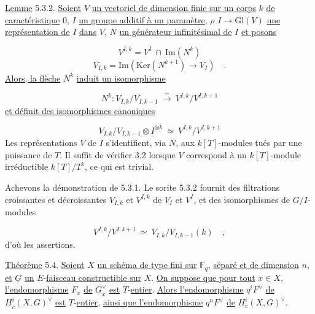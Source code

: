 \underline{Lemme} 5.3.2. \underline{Soient} $V$ \underline{un vectoriel de dimension finie sur un corps} $k$ \underline{de caractéristique} $0$, $I$ \underline{un groupe additif à un paramètre}, $\rho$ $I \longrightarrow \mathrm{Gl}(V)$ \underline{une représentation de} $I$ \underline{dans} $V$, $N$ \underline{un générateur infinitésimal de} $I$ \underline{et posons}

\begin{equation*}
V^{I,k} = V^I \ \cap \ \mathrm{Im}(N^k)
\end{equation*}
\begin{equation*}
V_{I,k} = \mathrm{Im}(\mathrm{Ker}(N^{k+1}) \longrightarrow V_I) \quad .
\end{equation*}
\underline{Alors, la flèche} $N^k$ \underline{induit un isomorphisme}

\begin{equation*}
N^k : V_{I,k}/V_{I,k-1} \ \overset{\sim}{\longrightarrow} \ V^{I,k}/V^{I,k+1}
\end{equation*}
\underline{et définit des isomorphismes canoniques}

\begin{equation*}
V_{I,k}/V_{I,k-1} \otimes I^{\otimes k} \ \simeq \ V^{I,k}/V^{I,k+1}
\end{equation*}
Les représentations $V$ de $I$ s'identifient, via $N$, aux $k[T]$-modules tués par une puissance de $T$. Il suffit de vérifier 3.2 lorsque $V$ correspond à un $k[T]$-module irréductible $k[T]/T^k$, ce qui est trivial.

Achevons la démonstration de 5.3.1. Le sorite 5.3.2 fournit des filtrations croissantes et décroissantes $V_{I,k}$ et $V^{I,k}$ de $V_I$ et $V^I$, et des isomorphismes de $G/I$-modules

\begin{equation*}
V^{I,k}/V^{I,k+1} \ \simeq \ V_{I,k}/V_{I,k-1}(k) \quad ,
\end{equation*}
d'où les assertions.



\underline{Théorème} 5.4. \underline{Soient} $X$ \underline{un schéma de type fini sur} $\mathbb{F}_q$, \underline{séparé et de dimension} $n$, \underline{et} $\underline{G}$ \underline{un} $E$-\underline{faisceau constructible sur} $X$. \underline{On suppose que pour tout} $x \in X$, \underline{l'endomorphisme} $F_x$ \underline{de} $\underline{G}_x^\vee$ \underline{est} $T$-\underline{entier}. \underline{Alors l'endomorphisme} $q^i F^\vee$ \underline{de} $\underline{H}_c^i(X,G)^\vee$ \underline{est} $T$-\underline{entier}, \underline{ainsi que l'endomorphisme} $q^n F^\vee$ \underline{de} $H_c^i(X,G)^\vee$.

